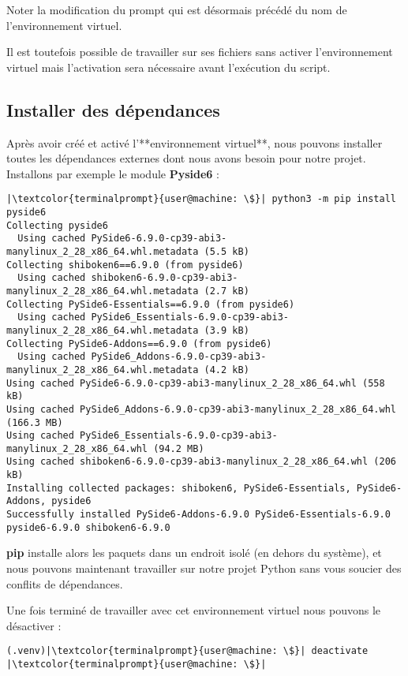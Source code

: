 Noter la modification du prompt qui est désormais précédé du nom de l'environnement virtuel.

Il est toutefois possible de travailler sur ses fichiers sans activer l'environnement virtuel mais l'activation sera nécessaire avant l'exécution du script.

\subsection*{Installer des dépendances}
Après avoir créé et activé l'**environnement virtuel**, nous pouvons installer toutes les dépendances externes dont nous avons besoin pour notre projet. Installons par exemple le module \textbf{Pyside6} :
\begin{lstlisting}[style=terminal]
|\textcolor{terminalprompt}{user@machine: \$}| python3 -m pip install pyside6
Collecting pyside6
  Using cached PySide6-6.9.0-cp39-abi3-manylinux_2_28_x86_64.whl.metadata (5.5 kB)
Collecting shiboken6==6.9.0 (from pyside6)
  Using cached shiboken6-6.9.0-cp39-abi3-manylinux_2_28_x86_64.whl.metadata (2.7 kB)
Collecting PySide6-Essentials==6.9.0 (from pyside6)
  Using cached PySide6_Essentials-6.9.0-cp39-abi3-manylinux_2_28_x86_64.whl.metadata (3.9 kB)
Collecting PySide6-Addons==6.9.0 (from pyside6)
  Using cached PySide6_Addons-6.9.0-cp39-abi3-manylinux_2_28_x86_64.whl.metadata (4.2 kB)
Using cached PySide6-6.9.0-cp39-abi3-manylinux_2_28_x86_64.whl (558 kB)
Using cached PySide6_Addons-6.9.0-cp39-abi3-manylinux_2_28_x86_64.whl (166.3 MB)
Using cached PySide6_Essentials-6.9.0-cp39-abi3-manylinux_2_28_x86_64.whl (94.2 MB)
Using cached shiboken6-6.9.0-cp39-abi3-manylinux_2_28_x86_64.whl (206 kB)
Installing collected packages: shiboken6, PySide6-Essentials, PySide6-Addons, pyside6
Successfully installed PySide6-Addons-6.9.0 PySide6-Essentials-6.9.0 pyside6-6.9.0 shiboken6-6.9.0
\end{lstlisting}

\textbf{pip} installe alors les paquets dans un endroit isolé (en dehors du système), et nous pouvons maintenant travailler sur notre projet Python sans vous soucier des conflits de dépendances.

Une fois terminé de travailler avec cet environnement virtuel nous pouvons le désactiver :
\begin{lstlisting}[style=terminal]
(.venv)|\textcolor{terminalprompt}{user@machine: \$}| deactivate
|\textcolor{terminalprompt}{user@machine: \$}|
\end{lstlisting}

